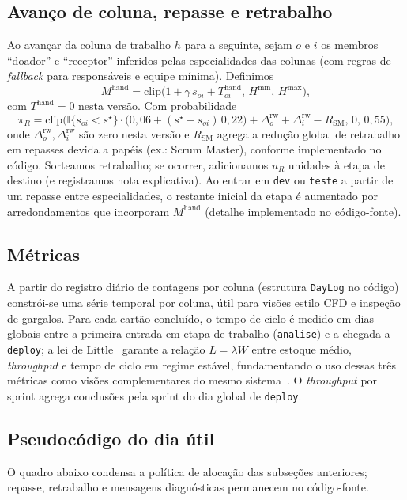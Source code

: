 \subsection{Avanço de coluna, repasse e retrabalho}
Ao avançar da coluna de trabalho $h$ para a seguinte, sejam $o$ e $i$ os membros ``doador'' e ``receptor'' inferidos pelas especialidades das colunas (com regras de \emph{fallback} para responsáveis e equipe mínima). Definimos
\[
M^{\text{hand}} = \mathrm{clip}\big(1+\gamma\, s_{oi} + T^{\text{hand}}_{oi},\,H^{\min},\,H^{\max}\big),
\]
com $T^{\text{hand}}=0$ nesta versão. Com probabilidade
\[
\pi_R = \mathrm{clip}\Big(\mathbb{I}\{s_{oi}<s^\star\}\cdot\big(0{,}06+(s^\star-s_{oi})\,0{,}22\big) + \Delta^{\text{rw}}_o+\Delta^{\text{rw}}_i - R_{\text{SM}},\,0,\,0{,}55\Big),
\]
onde $\Delta^{\text{rw}}_o,\Delta^{\text{rw}}_i$ são zero nesta versão e $R_{\text{SM}}$ agrega a redução global de retrabalho em repasses devida a papéis (ex.: Scrum Master), conforme implementado no código. Sorteamos retrabalho; se ocorrer, adicionamos $u_R$ unidades à etapa de destino (e registramos nota explicativa). Ao entrar em \texttt{dev} ou \texttt{teste} a partir de um repasse entre especialidades, o restante inicial da etapa é aumentado por arredondamentos que incorporam $M^{\text{hand}}$ (detalhe implementado no código-fonte).

\subsection{Métricas}
A partir do registro diário de contagens por coluna (estrutura \texttt{DayLog} no código) constrói-se uma série temporal por coluna, útil para visões estilo CFD e inspeção de gargalos. Para cada cartão concluído, o tempo de ciclo é medido em dias globais entre a primeira entrada em etapa de trabalho (\texttt{analise}) e a chegada a \texttt{deploy}; a lei de Little~\cite{little1961proof} garante a relação $L=\lambda W$ entre estoque médio, \emph{throughput} e tempo de ciclo em regime estável, fundamentando o uso dessas três métricas como visões complementares do mesmo sistema~\cite{hopp2008factory}. O \emph{throughput} por sprint agrega conclusões pela sprint do dia global de \texttt{deploy}.

\subsection{Pseudocódigo do dia útil}
O quadro abaixo condensa a política de alocação das subseções anteriores; repasse, retrabalho e mensagens diagnósticas permanecem no código-fonte.


